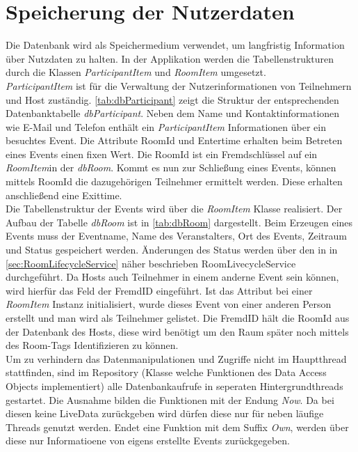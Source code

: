 \section{Speicherung der Nutzerdaten}
\label{sec:Datenbank}
Die Datenbank wird als Speichermedium verwendet, um langfristig Information über Nutzdaten zu halten. 
In der Applikation werden die Tabellenstrukturen durch die Klassen \textit{ParticipantItem} und \textit{RoomItem} umgesetzt. \\
\textit{ParticipantItem} ist für die Verwaltung der Nutzerinformationen von Teilnehmern und Host zuständig.
 \cref{tab:dbParticipant} zeigt die Struktur der entsprechenden Datenbanktabelle \textit{dbParticipant}. Neben dem Name und Kontaktinformationen wie E-Mail und Telefon enthält ein \textit{ParticipantItem} Informationen über ein besuchtes Event. Die Attribute RoomId und Entertime erhalten beim Betreten eines Events einen fixen Wert. 
Die RoomId ist ein Fremdschlüssel auf ein \textit{RoomItem}in der \textit{dbRoom}.
Kommt es nun zur Schließung eines Events, können mittels RoomId die dazugehörigen Teilnehmer ermittelt werden. 
Diese erhalten anschließend eine Exittime.\\
Die Tabellenstruktur der Events wird über die \textit{RoomItem} Klasse realisiert. Der Aufbau der Tabelle \textit{dbRoom} ist in \cref{tab:dbRoom} dargestellt. 
Beim Erzeugen eines Events muss der Eventname, Name des Veranstalters, Ort des Events, Zeitraum und Status gespeichert werden. Änderungen des Status werden über den in in \cref{sec:RoomLifecycleService} näher beschrieben RoomLivecycleService durchgeführt.
Da Hosts auch  Teilnehmer in einem anderne Event sein können, wird hierfür das Feld der FremdID eingeführt.
Ist das Attribut bei einer \textit{RoomItem} Instanz initialisiert, wurde dieses Event von einer anderen Person erstellt und man wird als Teilnehmer gelistet. Die FremdID hält die RoomId aus der Datenbank des Hosts, diese wird benötigt um den Raum später noch mittels des Room-Tags Identifizieren zu können.   \\
Um zu verhindern das  Datenmanipulationen und Zugriffe nicht im Hauptthread stattfinden, sind im Repository (Klasse welche Funktionen des Data Access Objects implementiert) alle Datenbankaufrufe in seperaten Hintergrundthreads gestartet.
Die Ausnahme bilden die Funktionen mit der Endung \textit{Now}. 
Da bei diesen keine LiveData zurückgeben wird dürfen diese nur für neben läufige Threads genutzt werden. 
Endet eine Funktion mit dem Suffix \textit{Own}, werden über diese nur  Informatioene von eigens erstellte Events zurückgegeben.
